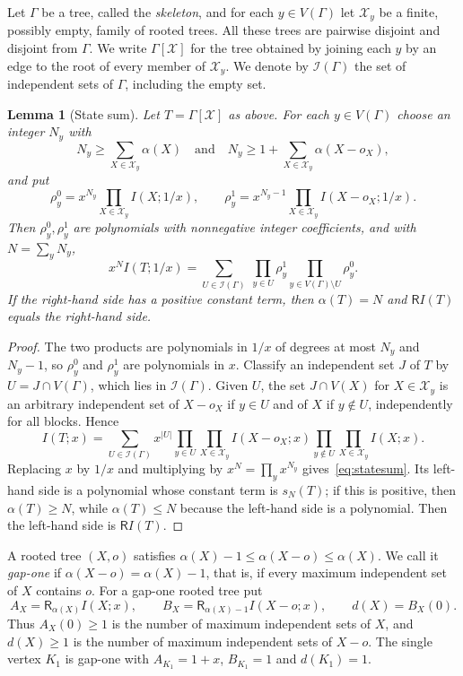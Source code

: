 \documentclass[11pt]{amsart}
\newtheorem{lemma}[theorem]{Lemma}
\theoremstyle{definition}
\theoremstyle{remark}
\numberwithin{equation}{section}
\newcommand{\cI}{\mathcal{I}}
\newcommand{\cX}{\mathcal{X}}
\newcommand{\R}{\mathsf{R}}
\begin{document}
Let $\Gamma$ be a tree, called the \emph{skeleton}, and for each $y\in V(\Gamma)$ let $\cX_y$ be a finite, possibly empty, family of rooted trees. All these trees are pairwise disjoint and disjoint from $\Gamma$. We write $\Gamma[\cX]$ for the tree obtained by joining each $y$ by an edge to the root of every member of $\cX_y$. We denote by $\cI(\Gamma)$ the set of independent sets of $\Gamma$, including the empty set.

\begin{lemma}[State sum]\label{lem:statesum}
Let $T=\Gamma[\cX]$ as above. For each $y\in V(\Gamma)$ choose an integer $N_y$ with
\[
N_y\ge\sum_{X\in\cX_y}\alpha(X)\quad\text{and}\quad N_y\ge1+\sum_{X\in\cX_y}\alpha(X-o_X),
\]
and put
\[
\rho_y^0=x^{N_y}\prod_{X\in\cX_y}I(X;1/x),\qquad\rho_y^1=x^{N_y-1}\prod_{X\in\cX_y}I(X-o_X;1/x).
\]
Then $\rho_y^0,\rho_y^1$ are polynomials with nonnegative integer coefficients, and with $N=\sum_yN_y$,
\begin{equation}\label{eq:statesum}
x^NI(T;1/x)=\sum_{U\in\cI(\Gamma)}\ \prod_{y\in U}\rho_y^1\prod_{y\in V(\Gamma)\setminus U}\rho_y^0.
\end{equation}
If the right-hand side has a positive constant term, then $\alpha(T)=N$ and $\R I(T)$ equals the right-hand side.
\end{lemma}

\begin{proof}
The two products are polynomials in $1/x$ of degrees at most $N_y$ and $N_y-1$, so $\rho_y^0$ and $\rho_y^1$ are polynomials in $x$. Classify an independent set $J$ of $T$ by $U=J\cap V(\Gamma)$, which lies in $\cI(\Gamma)$. Given $U$, the set $J\cap V(X)$ for $X\in\cX_y$ is an arbitrary independent set of $X-o_X$ if $y\in U$ and of $X$ if $y\notin U$, independently for all blocks. Hence
\[
I(T;x)=\sum_{U\in\cI(\Gamma)}x^{|U|}\prod_{y\in U}\prod_{X\in\cX_y}I(X-o_X;x)\prod_{y\notin U}\prod_{X\in\cX_y}I(X;x).
\]
Replacing $x$ by $1/x$ and multiplying by $x^N=\prod_yx^{N_y}$ gives~\eqref{eq:statesum}. Its left-hand side is a polynomial whose constant term is $s_N(T)$; if this is positive, then $\alpha(T)\ge N$, while $\alpha(T)\le N$ because the left-hand side is a polynomial. Then the left-hand side is $\R I(T)$.
\end{proof}

A rooted tree $(X,o)$ satisfies $\alpha(X)-1\le\alpha(X-o)\le\alpha(X)$. We call it \emph{gap-one} if $\alpha(X-o)=\alpha(X)-1$, that is, if every maximum independent set of $X$ contains $o$. For a gap-one rooted tree put
\[
A_X=\R_{\alpha(X)}I(X;x),\qquad B_X=\R_{\alpha(X)-1}I(X-o;x),\qquad d(X)=B_X(0).
\]
Thus $A_X(0)\ge1$ is the number of maximum independent sets of $X$, and $d(X)\ge1$ is the number of maximum independent sets of $X-o$. The single vertex $K_1$ is gap-one with $A_{K_1}=1+x$, $B_{K_1}=1$ and $d(K_1)=1$.
\end{document}
